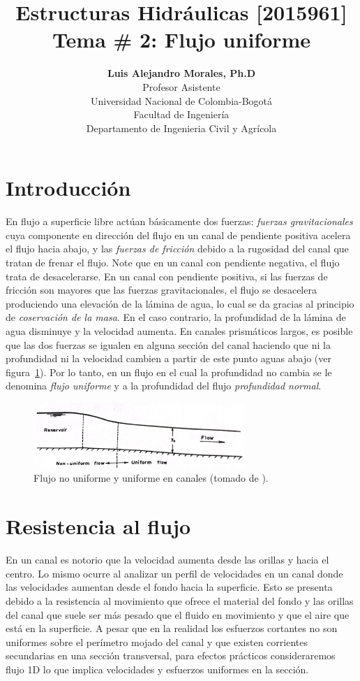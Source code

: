 \documentclass[11pt, oneside]{article}
\title{Estructuras Hidr\'aulicas [2015961] \\ \textbf{Tema \# 2: Flujo uniforme}}
\author{\textbf{Luis Alejandro Morales, Ph.D}\\ \vspace{0.4cm} Profesor Asistente \\ Universidad Nacional de Colombia-Bogot\'a\\Facultad de Ingenier\'ia \\ Departamento de Ingenieria Civil y Agr\'icola}
\date{}
\begin{document}
\maketitle
\tableofcontents


\section{Introducci\'on} %
En flujo a superficie libre actúan básicamente dos fuerzas: \emph{fuerzas gravitacionales} cuya componente en direcci\'on del flujo en un canal de pendiente positiva acelera el flujo hacia abajo, y las \emph{fuerzas de fricci\'on} debido a la rugosidad del canal que tratan de frenar el flujo. Note que en un canal con pendiente negativa, el flujo trata de desacelerarse. En un canal con pendiente positiva, si las fuerzas de fricci\'on son mayores que las fuerzas gravitacionales, el flujo se desacelera produciendo una elevación de la l\'amina de agua, lo cual se da gracias al principio de \emph{coservaci\'on de la masa}. En el caso contrario, la profundidad de la l\'amina de agua disminuye y la velocidad aumenta. En canales prism\'aticos largos, es posible que las dos fuerzas se igualen en alguna secci\'on del canal haciendo que ni la profundidad ni la velocidad cambien a partir de este punto aguas abajo (ver figura~\ref{fig1}). Por lo tanto, en un flujo en el cual la profundidad no cambia se le denomina \emph{flujo uniforme} y a la profundidad del flujo \emph{profundidad normal}.

\begin{figure}[h]
\centering
\includegraphics[width=8cm]{fig41.jpeg}
\caption{Flujo no uniforme y uniforme en canales (tomado de \cite{Chau}).}
\label{fig1}
\end{figure}


\section{Resistencia al flujo} %
En un canal es notorio que la velocidad aumenta desde las orillas y hacia el centro. Lo mismo ocurre al analizar un perfil de velocidades en un canal donde las velocidades aumentan desde el fondo hacia la superficie. Esto se presenta debido a la resistencia al movimiento que ofrece el material del fondo y las orillas del canal que suele ser m\'as pesado que el fluido en movimiento y que el aire que est\'a en la superficie. A pesar que en la realidad los esfuerzos cortantes no son uniformes sobre el per\'imetro mojado del canal y que existen corrientes secundarias en una secci\'on transversal, para efectos pr\'acticos consideraremos flujo 1D lo que implica velocidades y esfuerzos uniformes en la secci\'on. 
\end{document}
